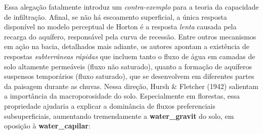 \documentclass[./main.tex]{subfiles}
\begin{document}
\noindent Essa alegação fatalmente introduz um \textit{contra-exemplo} para a teoria da capacidade de infiltração. Afinal, se não há escoamento superficial, a única resposta disponível no modelo perceptual de Horton é a resposta \textit{lenta} causada pela recarga do aquífero, responsável pela curva de recessão. Entre outros mecanismos em ação na bacia, detalhados mais adiante, os autores apontam a existência de respostas \textit{subterrâneas rápidas} que incluem tanto o fluxo de água em camadas de solo altamente permeáveis (fluxo não saturado), quanto a formação de aquíferos suspensos temporários (fluxo saturado), que se desenvolvem em diferentes partes da paisagem durante as chuvas. Nessa direção, Hursh \& Fletcher (1942) \cite{Hursh1942} salientam a importância da macroporosidade do solo. Especialmente em florestas, essa propriedade ajudaria a explicar a dominância de fluxos preferenciais subsuperficiais, aumentando tremendamente a \textbf{\gls{water_gravit}} do solo, em oposição à \textbf{\gls{water_capilar}}:
\end{document}
